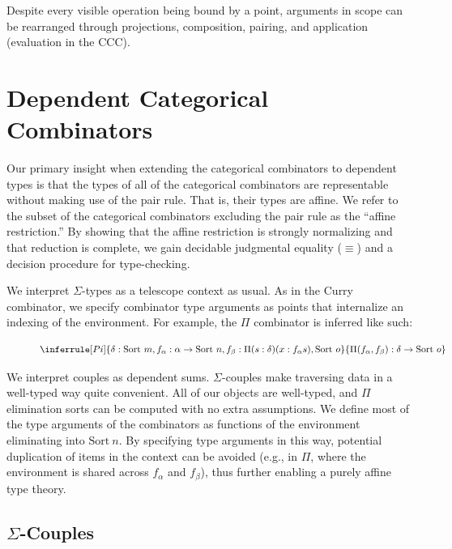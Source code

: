 \documentclass{article}
\newcommand{\sort}[1]{\text{Sort}\ #1}
\begin{document}
Despite every visible operation being bound by a point, arguments in scope can be rearranged through projections, composition, pairing, and application (evaluation in the CCC).

\section{Dependent Categorical Combinators}

Our primary insight when extending the categorical combinators to dependent types is that the types of all of the categorical combinators are representable without making use of the pair rule. That is, their types are affine. We refer to the subset of the categorical combinators excluding the pair rule as the ``affine restriction.'' By showing that the affine restriction is strongly normalizing and that reduction is complete, we gain decidable judgmental equality (\(\equiv\)) and a decision procedure for type-checking.

We interpret \(\Sigma\)-types as a telescope context as usual. As in the Curry combinator, we specify combinator type arguments as points that internalize an indexing of the environment. For example, the \(\Pi\) combinator is inferred like such:

\begin{figure}[h!]
  \centering
  \begin{equation}\label{infer_pi}
    \inferrule [Pi]
    { \delta : \sort{m}, f_{\alpha} : \alpha \rightarrow \sort{n}, f_{\beta} : \Pi(s : \delta)(x : f_\alpha s),\sort{o}}
    { \Pi(f_\alpha, f_\beta) : \delta \rightarrow \sort{o}}
  \end{equation}
\end{figure}

We interpret couples as dependent sums. \(\Sigma\)-couples make traversing data in a well-typed way quite convenient. All of our objects are well-typed, and \(\Pi\) elimination sorts can be computed with no extra assumptions. We define most of the type arguments of the combinators as functions of the environment eliminating into \(\sort{n}\). By specifying type arguments in this way, potential duplication of items in the context can be avoided (e.g., in \(\Pi\), where the environment is shared across \(f_\alpha\) and \(f_\beta\)), thus further enabling a purely affine type theory.

\subsection{\(\Sigma\)-Couples}
\end{document}
